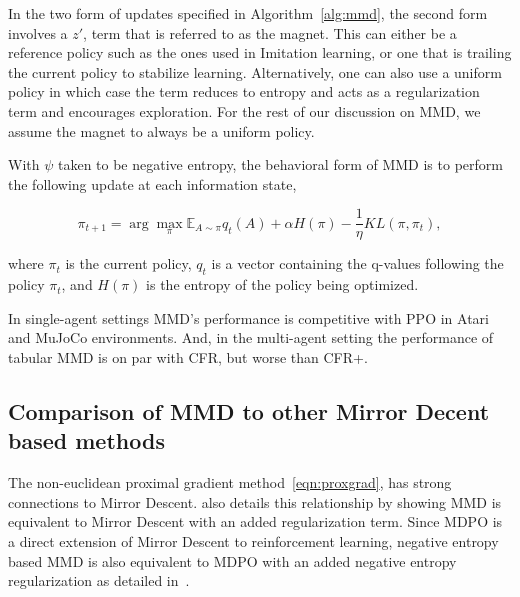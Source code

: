 In the two form of updates specified in Algorithm~\ref{alg:mmd}, the second form involves a $z'$,
term that is referred to as the magnet.
This can either be a reference policy such as the ones used in Imitation learning, or one that is
trailing the current policy to stabilize learning.
Alternatively, one can also use a uniform policy in which case the term reduces to entropy and acts
as a regularization term and encourages exploration.
For the rest of our discussion on MMD, we assume the magnet to always be a uniform policy.

With $\psi$ taken to be negative entropy, the behavioral form of MMD is to perform the following
update at each information state,

\begin{equation}
	\label{eqn:mmdbf} \pi_{t+1}
	= \arg \max_{\pi} \mathbb{E}_{A \sim \pi} q_t(A) + \alpha H(\pi) - \frac{1}{\eta} KL(\pi, \pi_t),
\end{equation}

where $\pi_t$ is the current policy, $q_t$ is a vector
containing the q-values following the policy $\pi_t$, and $H(\pi)$ is the entropy of the policy
being optimized.

In single-agent settings MMD's performance is competitive with PPO in Atari and MuJoCo
environments.
And, in the multi-agent setting the performance of tabular MMD is on par with CFR, but worse than
CFR+.

\subsection{Comparison of MMD to other Mirror Decent based methods}

The non-euclidean proximal gradient method~\ref{eqn:proxgrad}, has strong connections to Mirror Descent. 
\cite[Appendix D.3]{sokotaUnified2023} also details this relationship by showing MMD is equivalent to Mirror 
Descent with an added regularization term.
Since MDPO is a direct extension of Mirror Descent to reinforcement learning, negative entropy based MMD 
is also equivalent to MDPO with an added negative entropy regularization as detailed in~\cite[Appendix L]{sokotaUnified2023}.